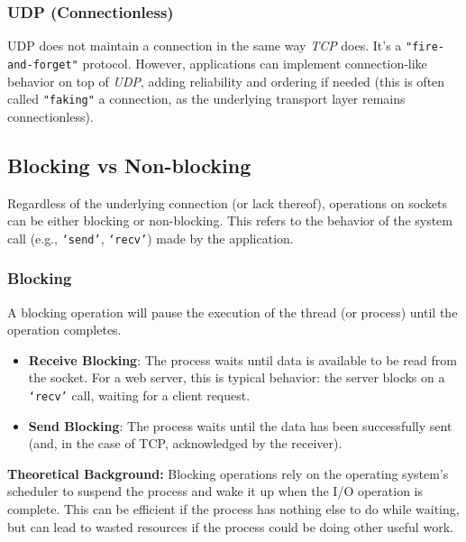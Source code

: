 \subsubsection{UDP (Connectionless)}
UDP does not maintain a connection in the same way \textit{TCP} does. It's a \texttt{"fire-and-forget"} protocol.  However, applications can implement connection-like behavior on top of \textit{UDP}, adding reliability and ordering if needed (this is often called \texttt{"faking"} a connection, as the underlying transport layer remains connectionless).

\subsection{Blocking vs Non-blocking}

Regardless of the underlying connection (or lack thereof), operations on sockets can be either blocking or non-blocking.  This refers to the behavior of the system call (e.g., \texttt{`send'}, \texttt{`recv'}) made by the application.


\subsubsection{Blocking} 
A blocking operation will pause the execution of the thread (or process) until the operation completes.
\begin{itemize}
    \item \textbf{Receive Blocking}: The process waits until data is available to be read from the socket.  For a web server, this is typical behavior: the server blocks on a \texttt{`recv'} call, waiting for a client request.
    \item \textbf{Send Blocking}: The process waits until the data has been successfully sent (and, in the case of TCP, acknowledged by the receiver).
\end{itemize}
\textbf{Theoretical Background:} Blocking operations rely on the operating system's scheduler to suspend the process and wake it up when the I/O operation is complete.  This can be efficient if the process has nothing else to do while waiting, but can lead to wasted resources if the process could be doing other useful work.


